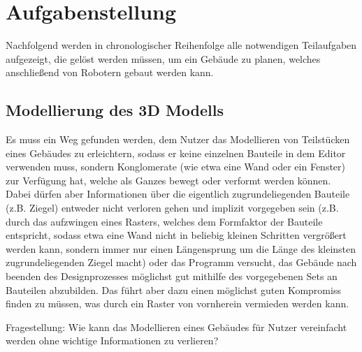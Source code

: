 \section{Aufgabenstellung}
Nachfolgend werden in chronologischer Reihenfolge alle notwendigen Teilaufgaben aufgezeigt, die gelöst werden müssen, um ein Gebäude zu planen, welches anschließend von Robotern gebaut werden kann.

\subsection{Modellierung des 3D Modells}
Es muss ein Weg gefunden werden, dem Nutzer das Modellieren von Teilstücken eines Gebäudes zu erleichtern, sodass er keine einzelnen Bauteile in dem Editor verwenden muss, sondern Konglomerate (wie etwa eine Wand oder ein Fenster) zur Verfügung hat, welche als Ganzes bewegt oder verformt werden können.
Dabei dürfen aber Informationen über die eigentlich zugrundeliegenden Bauteile (z.B. Ziegel) entweder nicht verloren gehen und implizit vorgegeben sein (z.B. durch das aufzwingen eines Rasters, welches dem Formfaktor der Bauteile entspricht, sodass etwa eine Wand nicht in beliebig kleinen Schritten vergrößert werden kann, sondern immer nur einen Längensprung um die Länge des kleinsten zugrundeliegenden Ziegel macht) oder das Programm versucht, das Gebäude nach beenden des Designprozesses möglichst gut mithilfe des vorgegebenen Sets an Bauteilen abzubilden. Das führt aber dazu einen möglichst guten Kompromiss finden zu müssen, was durch ein Raster von vornherein vermieden werden kann.

Fragestellung: Wie kann das Modellieren eines Gebäudes für Nutzer vereinfacht werden ohne wichtige Informationen zu verlieren?

